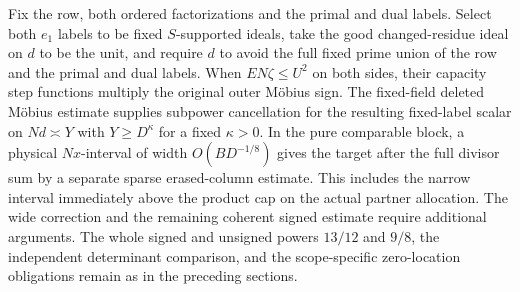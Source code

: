 Fix the row, both ordered factorizations and the primal and dual
labels. Select both \(e_1\) labels to be fixed \(S\)-supported ideals,
take the good changed-residue ideal on \(d\) to be the unit, and require
\(d\) to avoid the full fixed prime union of the row and the primal and
dual labels. When \(E N\zeta\le U^2\) on both sides, their capacity step
functions multiply the original outer M\"obius sign. The fixed-field
deleted M\"obius estimate supplies subpower cancellation for the
resulting fixed-label scalar on \(Nd\asymp Y\) with \(Y\ge D^\kappa\) for
a fixed \(\kappa>0\). In the pure comparable block, a physical \(Nx\)-interval of
width \(O(BD^{-1/8})\) gives the target after the full divisor sum by a
separate sparse erased-column estimate. This includes the narrow
interval immediately above the product cap on the actual partner
allocation. The wide correction and the remaining coherent signed
estimate require additional arguments. The whole signed and unsigned
powers \(13/12\) and \(9/8\), the independent determinant comparison,
and the scope-specific zero-location obligations remain as in the
preceding sections.

